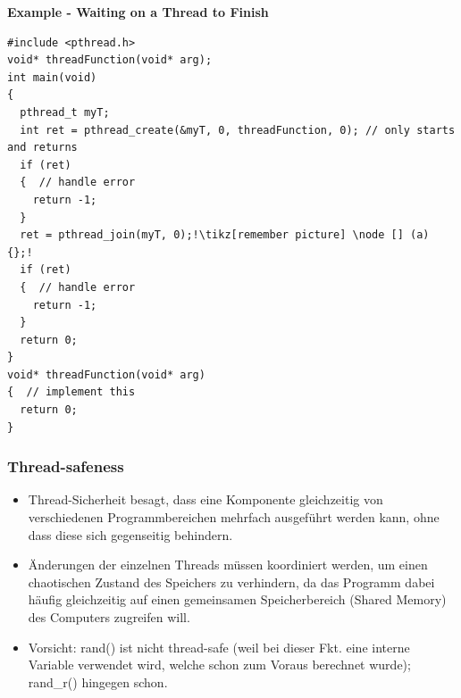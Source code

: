 \newpage
\textbf{Example - Waiting on a Thread to Finish}
\begin{lstlisting}[style=C, escapechar=!]
#include <pthread.h>
void* threadFunction(void* arg);
int main(void)
{
  pthread_t myT;
  int ret = pthread_create(&myT, 0, threadFunction, 0); // only starts and returns
  if (ret)
  {  // handle error
    return -1;
  }
  ret = pthread_join(myT, 0);!\tikz[remember picture] \node [] (a) {};!
  if (ret)
  {  // handle error
    return -1;
  }
  return 0;
}
void* threadFunction(void* arg)
{  // implement this
  return 0;
}
\end{lstlisting}
%

\subsubsection{Thread-safeness}
\begin{itemize}
  \item Thread-Sicherheit besagt, dass eine Komponente gleichzeitig von verschiedenen Programmbereichen mehrfach ausgeführt werden kann, ohne dass diese sich gegenseitig behindern.
  \item Änderungen der einzelnen Threads müssen koordiniert werden, um einen chaotischen Zustand des Speichers zu verhindern, da das Programm dabei häufig gleichzeitig auf einen gemeinsamen Speicherbereich (Shared Memory) des Computers zugreifen will.
  \item Vorsicht: rand() ist nicht thread-safe (weil bei dieser Fkt. eine interne Variable verwendet wird, welche schon zum Voraus berechnet wurde); rand\_r() hingegen schon.
\end{itemize}

